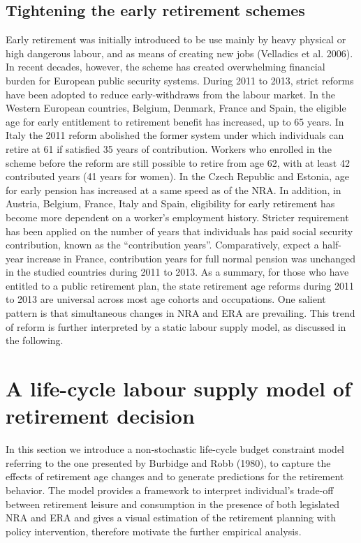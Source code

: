 \documentclass[a4paper]{article}
\begin{document}
  \subsection{Tightening the early retirement schemes} 
  
  Early retirement was initially introduced to be use mainly by heavy physical or high dangerous labour, and as means of creating new jobs (Velladics et al. 2006). In recent decades, however, the scheme has created overwhelming financial burden for European public security systems. During 2011 to 2013, strict reforms have been adopted to reduce early-withdraws from the labour market. In the Western European countries, Belgium, Denmark, France and Spain, the eligible age for early entitlement to retirement benefit has increased, up to 65 years. In Italy the 2011 reform abolished the former system under which individuals can retire at 61 if satisfied 35 years of contribution. Workers who enrolled in the scheme before the reform are still possible to retire from age 62, with at least 42 contributed years (41 years for women).  In the Czech Republic and Estonia, age for early pension has increased at a same speed as of the NRA. In addition, in Austria, Belgium, France, Italy and Spain, eligibility for early retirement has become more dependent on a worker’s employment history. Stricter requirement has been applied on the number of years that individuals has paid social security contribution, known as the “contribution years”. Comparatively, expect a half-year increase in France, contribution years for full normal pension was unchanged in the studied countries during 2011 to 2013. As a summary, for those who have entitled to a public retirement plan, the state retirement age reforms during 2011 to 2013 are universal across most age cohorts and occupations. One salient pattern is that simultaneous changes in NRA and ERA are prevailing. This trend of reform is further interpreted by a static labour supply model, as discussed in the following.  

\section{A life-cycle labour supply model of retirement decision}

In this section we introduce a non-stochastic life-cycle budget constraint model referring to the one presented by Burbidge and Robb (1980), to capture the effects of retirement age changes and to generate predictions for the retirement behavior. The model provides a framework to interpret individual’s trade-off between retirement leisure and consumption in the presence of both legislated NRA and ERA and gives a visual estimation of the retirement planning with policy intervention, therefore motivate the further empirical analysis.
\end{document}
